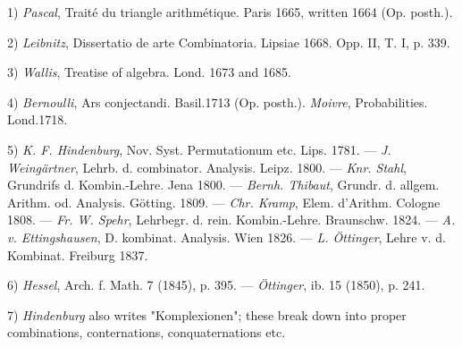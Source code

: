 \vspace{0.1cm}
\leftline{\rule{2in}{0.4pt}}
\vspace{0.1cm}
{
\footnotesize
1) \textit{Pascal}, Traité du triangle arithmétique. Paris 1665, written 1664 (Op. posth.).

2) \textit{Leibnitz}, Dissertatio de arte Combinatoria. Lipsiae 1668. Opp. II, T. I, p. 339.

3) \textit{Wallis}, Treatise of algebra. Lond. 1673 and 1685.

4) \textit{Bernoulli}, Ars conjectandi. Basil.1713 (Op. posth.). \textit{Moivre}, Probabilities. Lond.1718.

5) \textit{K. F. Hindenburg}, Nov. Syst. Permutationum etc. Lips. 1781. — \textit{J. Weingärtner}, Lehrb. d. combinator. Analysis. Leipz. 1800. — \textit{Knr. Stahl}, Grundrifs d. Kombin.-Lehre. Jena 1800. — \textit{Bernh. Thibaut}, Grundr. d. allgem. Arithm. od. Analysis. Götting. 1809. — \textit{Chr. Kramp}, Elem. d'Arithm. Cologne 1808. — \textit{Fr. W. Spehr}, Lehrbegr. d. rein. Kombin.-Lehre. Braunschw. 1824. — \textit{A. v. Ettingshausen}, D. kombinat. Analysis. Wien 1826. — \textit{L. Öttinger}, Lehre v. d. Kombinat. Freiburg 1837.

6) \textit{Hessel}, Arch. f. Math. 7 (1845), p. 395. — \textit{Öttinger}, ib. 15 (1850), p. 241.

7) \textit{Hindenburg} also writes "Komplexionen"; these break down into proper combinations, conternations, conquaternations etc.

}
